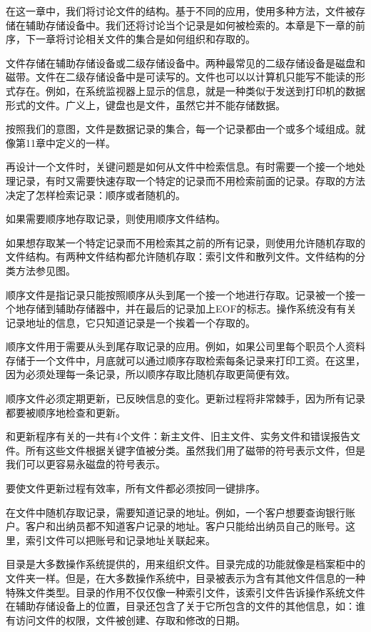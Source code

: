
在这一章中，我们将讨论文件的结构。基于不同的应用，使用多种方法，文件被存储在辅助存储设备中。我们还将讨论当个记录是如何被检索的。本章是下一章的前序，下一章将讨论相关文件的集合是如何组织和存取的。

文件存储在辅助存储设备或二级存储设备中。两种最常见的二级存储设备是磁盘和磁带。文件在二级存储设备中是可读写的。文件也可以以计算机只能写不能读的形式存在。例如，在系统监视器上显示的信息，就是一种类似于发送到打印机的数据形式的文件。广义上，键盘也是文件，虽然它并不能存储数据。

按照我们的意图，文件是数据记录的集合，每一个记录都由一个或多个域组成。就像第11章中定义的一样。

再设计一个文件时，关键问题是如何从文件中检索信息。有时需要一个接一个地处理记录，有时又需要快速存取一个特定的记录而不用检索前面的记录。存取的方法决定了怎样检索记录：顺序或者随机的。

如果需要顺序地存取记录，则使用顺序文件结构。

如果想存取某一个特定记录而不用检索其之前的所有记录，则使用允许随机存取的文件结构。有两种文件结构都允许随机存取：索引文件和散列文件。文件结构的分类方法参见图。

顺序文件是指记录只能按照顺序从头到尾一个接一个地进行存取。记录被一个接一个地存储到辅助存储器中，并在最后的记录加上EOF的标志。操作系统没有有关记录地址的信息，它只知道记录是一个挨着一个存取的。

顺序文件用于需要从头到尾存取记录的应用。例如，如果公司里每个职员个人资料存储于一个文件中，月底就可以通过顺序存取检索每条记录来打印工资。在这里，因为必须处理每一条记录，所以顺序存取比随机存取更简便有效。

顺序文件必须定期更新，已反映信息的变化。更新过程将非常棘手，因为所有记录都要被顺序地检查和更新。

和更新程序有关的一共有4个文件：新主文件、旧主文件、实务文件和错误报告文件。所有这些文件根据关键字值被分类。虽然我们用了磁带的符号表示文件，但是我们可以更容易永磁盘的符号表示。

要使文件更新过程有效率，所有文件都必须按同一键排序。

在文件中随机存取记录，需要知道记录的地址。例如，一个客户想要查询银行账户。客户和出纳员都不知道客户记录的地址。客户只能给出纳员自己的账号。这里，索引文件可以把账号和记录地址关联起来。

目录是大多数操作系统提供的，用来组织文件。目录完成的功能就像是档案柜中的文件夹一样。但是，在大多数操作系统中，目录被表示为含有其他文件信息的一种特殊文件类型。目录的作用不仅仅像一种索引文件，该索引文件告诉操作系统文件在辅助存储设备上的位置，目录还包含了关于它所包含的文件的其他信息，如：谁有访问文件的权限，文件被创建、存取和修改的日期。

